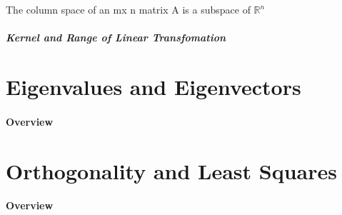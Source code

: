 \documentclass{article}
\begin{document}
\begin{theorem}
    The column space of an mx n matrix A is a subspace of $\mathbb{R}^n$
\end{theorem}

\subsubsection{Kernel and Range of Linear Transfomation}

\begin{definition}
\end{definition}

\part{Eigenvalues and Eigenvectors}
\subsection{Overview}
\part{Orthogonality and Least Squares}
\subsection{Overview}
\end{document}
